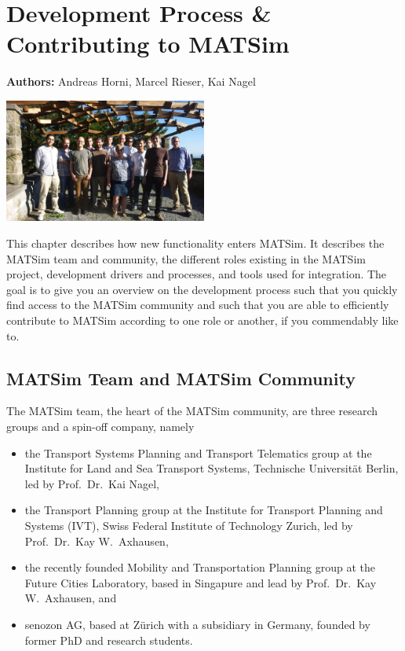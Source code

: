 \chapter{Development Process \& Contributing to MATSim}
\label{ch:developmentprocess}

\hfill \textbf{Authors:} Andreas Horni, Marcel Rieser, Kai Nagel

\begin{center} \includegraphics[width=0.5\textwidth, angle=0]{extending/figures/ConceptualMeetingVillaHatt.png} \end{center}

This chapter describes how new functionality enters MATSim. It describes the MATSim team and community, the different roles existing in the MATSim project, development drivers and processes, and tools used for integration. The goal is to give you an overview on the development process such that you quickly find access to the MATSim community and such that you are able to efficiently contribute to MATSim according to one role or another, if you commendably like to.

\section{MATSim Team and MATSim Community}
The MATSim team, the heart of the MATSim community, are three research groups and a spin-off company, namely 
\begin{itemize}
\item the Transport Systems Planning and Transport Telematics group at the Institute for Land and Sea Transport Systems, Technische Universität Berlin, led by Prof.\ Dr.\ Kai Nagel,
\item the Transport Planning group at the Institute for Transport Planning and Systems (IVT), Swiss Federal Institute of Technology Zurich, led by Prof.\ Dr.\ Kay W.\ Axhausen, 
\item the recently founded Mobility and Transportation Planning group at the Future Cities Laboratory, based in Singapure and lead by Prof.\ Dr.\ Kay W.\ Axhausen, and 
\item senozon AG, based at Zürich with a subsidiary in Germany, founded by former PhD and research students. 
\end{itemize}

